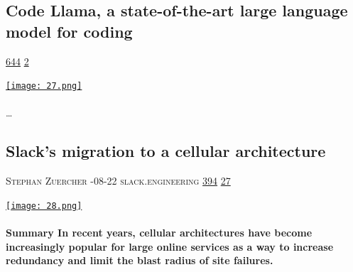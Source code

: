 \documentclass[10pt,a4paper]{article}
\begin{document}
\begin{multicols}{2}
\raggedcolumns
\noindent\begin{minipage}{\linewidth}
\medskip
\subsection{Code Llama, a state-of-the-art large language model for coding}
\textsc{\footnotesize
{\scriptsize\faThumbsOUp}\space 
\href{http://news.ycombinator.com/item?id=37248844\&utm\_term=comment}{644} 
{\scriptsize\faComments}\space 
\href{http://news.ycombinator.com/item?id=37248844\&utm\_term=comment}{2} 
}
\par\medskip\noindent
\href{https://ai.meta.com/blog/code-llama-large-language-model-coding/?utm\_source=hackernewsletter\&utm\_medium=email\&utm\_term=code}{
    \texttt{[image: 27.png]}
}
\end{minipage}
\paragraph{}

\dots\par
\noindent\begin{minipage}{\linewidth}
\medskip
\subsection{Slack’s migration to a cellular architecture}
\textsc{\footnotesize
{\scriptsize\faUser}\space 
Stephan Zuercher 
{\scriptsize\faCalendar}-08-22 
{\scriptsize\faGlobe}\space 
slack.engineering 
{\scriptsize\faThumbsOUp}\space 
\href{http://news.ycombinator.com/item?id=37274871\&utm\_term=comment}{394} 
{\scriptsize\faComments}\space 
\href{http://news.ycombinator.com/item?id=37274871\&utm\_term=comment}{27} 
}
\par\medskip\noindent
\href{https://slack.engineering/slacks-migration-to-a-cellular-architecture/?utm\_source=hackernewsletter\&utm\_medium=email\&utm\_term=code}{
    \texttt{[image: 28.png]}
}
\end{minipage}
\paragraph{}
\textbf{Summary
In recent years, cellular architectures have become increasingly popular for large online services as a way to increase redundancy and limit the blast radius of site failures.}

\end{multicols}
\end{document}
